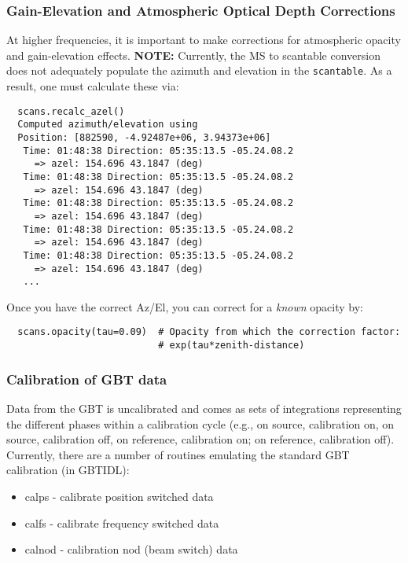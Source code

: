 \subsubsection{Gain-Elevation and Atmospheric Optical Depth Corrections}
\label{subsubsection:sd.asap.calib.gain}

At higher frequencies, it is important to make corrections for
atmospheric opacity and gain-elevation effects. {\bf NOTE:} Currently,
the MS to scantable conversion does not adequately populate the
azimuth and elevation in the {\tt scantable}. As a result, one must
calculate these via:

\small
\begin{verbatim}
  scans.recalc_azel()
  Computed azimuth/elevation using 
  Position: [882590, -4.92487e+06, 3.94373e+06]
   Time: 01:48:38 Direction: 05:35:13.5 -05.24.08.2
     => azel: 154.696 43.1847 (deg)
   Time: 01:48:38 Direction: 05:35:13.5 -05.24.08.2
     => azel: 154.696 43.1847 (deg)
   Time: 01:48:38 Direction: 05:35:13.5 -05.24.08.2
     => azel: 154.696 43.1847 (deg)
   Time: 01:48:38 Direction: 05:35:13.5 -05.24.08.2
     => azel: 154.696 43.1847 (deg)
   Time: 01:48:38 Direction: 05:35:13.5 -05.24.08.2
     => azel: 154.696 43.1847 (deg)
   ...
\end{verbatim}
\normalsize


Once you have the correct Az/El, you can correct for a {\it known}
opacity by:

\small
\begin{verbatim}
  scans.opacity(tau=0.09)  # Opacity from which the correction factor: 
                           # exp(tau*zenith-distance)
\end{verbatim}
\normalsize


\subsubsection{Calibration of GBT data}
\label{subsubsection:sd.asap.calib.gbt}

Data from the GBT is uncalibrated and comes as sets of integrations
representing the different phases within a calibration cycle (e.g., on
source, calibration on, on source, calibration off, on reference,
calibration on; on reference, calibration off). Currently, there are a
number of routines emulating the standard GBT calibration (in GBTIDL):
\begin{itemize}
   \item calps - calibrate position switched data
   \item calfs - calibrate frequency switched data
   \item calnod - calibration nod (beam switch) data
\end{itemize}

